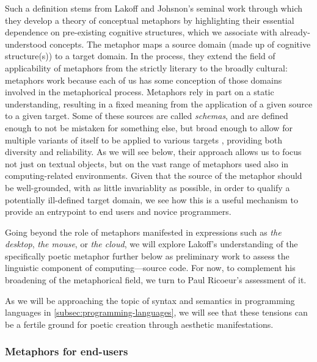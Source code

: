 Such a definition stems from Lakoff and Johsnon's seminal work through which they develop a theory of conceptual metaphors by highlighting their essential dependence on pre-existing cognitive structures, which we associate with already-understood concepts. The metaphor maps a source domain (made up of cognitive structure(s)) to a target domain. In the process, they extend the field of applicability of metaphors from the strictly literary to the broadly cultural: metaphors work because each of us has some conception of those domains involved in the metaphorical process. Metaphors rely in part on a static understanding, resulting in a fixed meaning from the application of a given source to a given target. Some of these sources are called \emph{schemas}, and are defined enough to not be mistaken for something else, but broad enough to allow for multiple variants of itself to be applied to various targets \citep{lakoff_metaphors_1980}, providing both diversity and reliability. As we will see below, their approach allows us to focus not just on textual objects, but on the vast range of metaphors used also in computing-related environments. Given that the source of the metaphor should be well-grounded, with as little invariablity as possible, in order to qualify a potentially ill-defined target domain, we see how this is a useful mechanism to provide an entrypoint to end users and novice programmers.

Going beyond the role of metaphors manifested in expressions such as \emph{the desktop}, \emph{the mouse}, or \emph{the cloud}, we will explore Lakoff's understanding of the specifically poetic metaphor further below as preliminary work to assess the linguistic component of computing—source code. For now, to complement his broadening of the metaphorical field, we turn to Paul Ricoeur's assessment of it.

As we will be approaching the topic of syntax and semantics in programming languages in \ref{subsec:programming-languages}, we will see that these tensions can be a fertile ground for poetic creation through aesthetic manifestations.

\subsubsection{Metaphors for end-users}
\label{subsubsec:metaphors-users}

